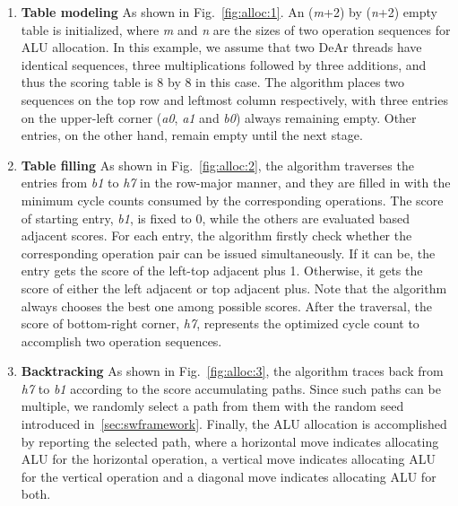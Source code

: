\begin{enumerate}
    \item \textbf{Table modeling} As shown in Fig.~\ref{fig:alloc:1}. An (\textit{m}+2) by (\textit{n}+2) empty table is initialized, 
        where \textit{m} and \textit{n} are the sizes of two operation sequences for ALU allocation.
        In this example, we assume that two DeAr threads have identical sequences, three multiplications followed by three additions, 
        and thus the scoring table is 8 by 8 in this case.
        The algorithm places two sequences on the top row and leftmost column respectively, 
        with three entries on the upper-left corner (\textit{a0}, \textit{a1} and \textit{b0}) always remaining empty. 
        Other entries, on the other hand, remain empty until the next stage.
    \item \textbf{Table filling} As shown in Fig.~\ref{fig:alloc:2}, the algorithm traverses the entries from \textit{b1} to \textit{h7} in the row-major manner, 
        and they are filled in with the minimum cycle counts consumed by the corresponding operations.
        The score of starting entry, \textit{b1}, is fixed to 0, while the others are evaluated based adjacent scores.
        For each entry, the algorithm firstly check whether the corresponding operation pair can be issued simultaneously.
        If it can be, the entry gets the score of the left-top adjacent plus 1.
        Otherwise, it gets the score of either the left adjacent or top adjacent plus.
        Note that the algorithm always chooses the best one among possible scores.
        After the traversal, the score of bottom-right corner, \textit{h7}, represents the optimized cycle count to accomplish two operation sequences.
    \item \textbf{Backtracking} As shown in Fig.~\ref{fig:alloc:3}, the algorithm traces back from \textit{h7} to \textit{b1} according to the score accumulating paths.
        Since such paths can be multiple, we randomly select a path from them with the random seed introduced in~\ref{sec:swframework}.
        Finally, the ALU allocation is accomplished by reporting the selected path, 
        where a horizontal move indicates allocating ALU for the horizontal operation,
        a vertical move indicates allocating ALU for the vertical operation and a diagonal move indicates allocating ALU for both.
\end{enumerate}
\vspace{\textfig}
